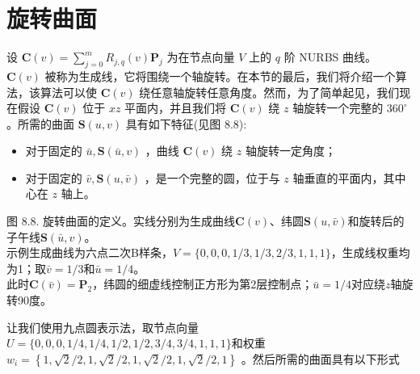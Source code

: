 \documentclass[../main.tex]{subfiles}
\begin{document}
\section{旋转曲面}
设 \(\mathbf{C}\left( v\right)  = \mathop{\sum }\limits_{{j = 0}}^{m}{R}_{j,q}\left( v\right) {\mathbf{P}}_{j}\) 为在节点向量 \(V\) 上的 \(q\) 阶 NURBS 曲线。 \(\mathbf{C}\left( v\right)\) 被称为生成线，它将围绕一个轴旋转。在本节的最后，我们将介绍一个算法，该算法可以使 \(\mathbf{C}\left( v\right)\) 绕任意轴旋转任意角度。然而，为了简单起见，我们现在假设 \(\mathbf{C}\left( v\right)\) 位于 \({xz}\) 平面内，并且我们将 \(\mathbf{C}\left( v\right)\) 绕 \(z\) 轴旋转一个完整的 \({360}^{ \circ  }\) 。所需的曲面 \(\mathbf{S}\left( {u,v}\right)\) 具有如下特征(见图 8.8):











\begin{itemize}
\item 对于固定的 \(\bar{u},\mathbf{S}\left( {\bar{u},v}\right)\) ，曲线 \(\mathbf{C}\left( v\right)\) 绕 \(z\) 轴旋转一定角度；
\end{itemize}

\begin{itemize}
\item 对于固定的 \(\bar{v},\mathbf{S}\left( {u,\bar{v}}\right)\) ，是一个完整的圆，位于与 \(z\) 轴垂直的平面内，其中心在 \(z\) 轴上。
\end{itemize}

\begin{center}
\begin{minipage}{34cm}
\vspace*{.6\baselineskip}
\centering
{}
\par\smallskip
图 8.8. 旋转曲面的定义。实线分别为生成曲线$\mathbf C(v)$、纬圆$\mathbf S(u,\bar v)$和旋转后的子午线$\mathbf S(\bar u,v)$。\\
示例生成曲线为六点二次B样条，$V=\{0,0,0,1/3,1/3,2/3,1,1,1\}$，生成线权重均为1；取$\bar v=1/3$和$\bar u=1/4$。\\
此时$\mathbf C(\bar v)=\mathbf P_2$，纬圆的细虚线控制正方形为第2层控制点；$\bar u=1/4$对应绕$z$轴旋转90度。
\end{minipage}
\end{center}

让我们使用九点圆表示法，取节点向量\(U=\{0,0,0,1/4,1/4,1/2,1/2,3/4,3/4,1,1,1\}\)和权重 \({w}_{i} = \left\{  {1,\sqrt{2}/2,1,\sqrt{2}/2,1,\sqrt{2}/2,1,\sqrt{2}/2,1}\right\}\) 。然后所需的曲面具有以下形式
\end{document}
